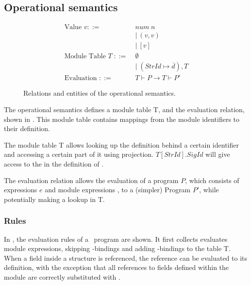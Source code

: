 \subsection{Operational semantics}
\label{sec:MLOperationalSemantics}
\begin{figure}[htb]
\begin{align*}
\text{Value }v ::=\;&\mathit{num\;n} \\ %
&|\ (v,v) \\
&|\ [v]
\\
\text{Module Table } T\; ::= \;&\emptyset \\
&| \; (\mathit{StrId} \mapsto %
\overline{d}
), T \\
\text{Evaluation } ::=\;& T \vdash P \rightarrow T \vdash P'
\end{align*}
\caption[Operational Semantic Entities]{Relations and entities of the operational semantics.\label{fig:MiniMLOperationalSemanticEntitiesAndRelations}}
\end{figure}

The operational semantics defines a module table T, and the evaluation relation, shown in .
This module table contains mappings from the %
module identifiers to their definition. 

The module table T allows looking up the definition behind a certain identifier and accessing a certain part of it using projection. $T[\mathit{StrId}].\mathit{SigId}$ will give access to the  in the definition of . 

The evaluation relation allows the evaluation of a program $P$, which consists of expressions $e$ and module expressions , to a (simpler) Program $P'$, while potentially making a lookup in T.

\subsubsection{Rules}
In , the evaluation rules of a \MiniML\ program are shown.
It first collects evaluates module expressions, skipping -bindings and adding -bindings to the table T.
When a field inside a structure is referenced, the reference can be evaluated to its definition, with the exception that all references to fields  defined within the module are correctly substituted with .

